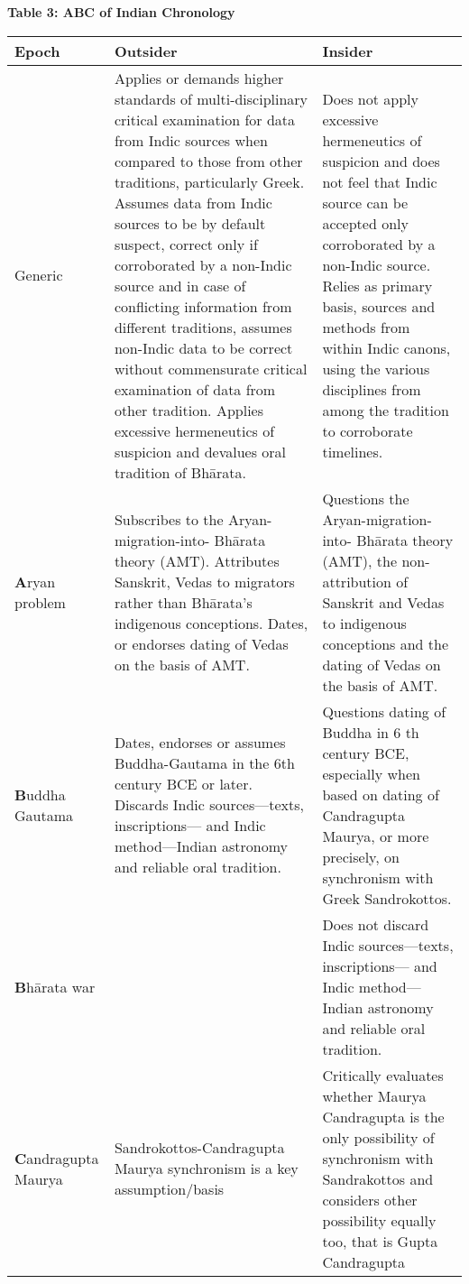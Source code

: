 \textbf{Table 3: ABC of Indian Chronology}

\begin{longtable}{|p{1.4cm}|p{3.6cm}|p{3.6cm}|}
\hline
Epoch & Outsider & Insider \\
\hline
Generic & Applies or demands higher standards of multi-disciplinary critical examination for data from Indic sources when compared to those from other traditions, particularly Greek. Assumes data from Indic sources to be by default suspect, correct only if corroborated by a non-Indic source and in case of conflicting information from different traditions, assumes non-Indic data to be correct without commensurate critical examination of data from other tradition. Applies excessive hermeneutics of suspicion and devalues oral tradition of Bhārata. & Does not apply excessive hermeneutics of suspicion and does not feel that Indic source can be accepted only corroborated by a non-Indic source. Relies as primary basis, sources and methods from within Indic canons, using the various disciplines from among the tradition to corroborate timelines. \\
\hline
\textbf{A}ryan problem & Subscribes to the Aryan-migration-into- Bhārata theory (AMT). Attributes Sanskrit, Vedas to migrators rather than Bhārata’s indigenous conceptions. Dates, or endorses dating of Vedas on the basis of AMT. & Questions the Aryan-migration-into- Bhārata theory (AMT), the non-attribution of Sanskrit and Vedas to indigenous conceptions and the dating of Vedas on the basis of AMT. \\
\hline
\textbf{B}uddha Gautama & Dates, endorses or assumes Buddha-Gautama in the 6th century BCE or later. Discards Indic sources—texts, inscriptions— and Indic method—Indian astronomy and reliable oral tradition. & Questions dating of Buddha in 6 th   century BCE, especially when based on dating of Candragupta Maurya, or more precisely, on synchronism with Greek Sandrokottos. \\
\hline
\textbf{B}hārata war &  & Does not discard Indic sources—texts, inscriptions— and Indic method—Indian astronomy and reliable oral tradition. \\
\hline
\textbf{C}andra\-gupta Maurya & Sandrokottos-Candragupta Maurya synchronism is a key assumption/basis & Critically evaluates whether Maurya Candragupta is the only possibility of synchronism with Sandrakottos and considers other possibility equally too, that is Gupta Candragupta \\
\hline
\end{longtable}


